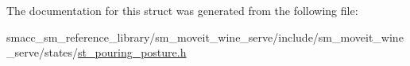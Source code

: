 The documentation for this struct was generated from the following file\+:\begin{DoxyCompactItemize}
\item 
smacc\+\_\+sm\+\_\+reference\+\_\+library/sm\+\_\+moveit\+\_\+wine\+\_\+serve/include/sm\+\_\+moveit\+\_\+wine\+\_\+serve/states/\hyperlink{st__pouring__posture_8h}{st\+\_\+pouring\+\_\+posture.\+h}\end{DoxyCompactItemize}
